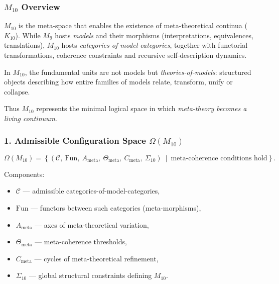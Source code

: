 

\subsubsection{$M_{10}$ Overview}
\label{sec:m10-overview}

$M_{10}$ is the meta-space that enables the existence of
meta-theoretical continua ($K_{10}$).
While $M_9$ hosts \emph{models} and their morphisms
(interpretations, equivalences, translations),
$M_{10}$ hosts \emph{categories of model-categories},
together with functorial transformations,
coherence constraints and recursive self-description dynamics.

In $M_{10}$, the fundamental units are not models but \emph{theories-of-models}:
structured objects describing how entire families of models relate, transform,
unify or collapse.

Thus $M_{10}$ represents the minimal logical space in which
\emph{meta-theory becomes a living continuum}.

\subsubsection*{1. Admissible Configuration Space $\Omega(M_{10})$}

\[
\Omega(M_{10}) =
\left\{
(\mathcal{C},\ \mathrm{Fun},\ A_{\mathrm{meta}},\
\Theta_{\mathrm{meta}},\ C_{\mathrm{meta}},\ \Sigma_{10})
\ \middle|\
\text{meta-coherence conditions hold}
\right\}.
\]

Components:

\begin{itemize}
    \item $\mathcal{C}$ — admissible categories-of-model-categories,
    \item $\mathrm{Fun}$ — functors between such categories (meta-morphisms),
    \item $A_{\mathrm{meta}}$ — axes of meta-theoretical variation,
    \item $\Theta_{\mathrm{meta}}$ — meta-coherence thresholds,
    \item $C_{\mathrm{meta}}$ — cycles of meta-theoretical refinement,
    \item $\Sigma_{10}$ — global structural constraints defining $M_{10}$.
\end{itemize}

